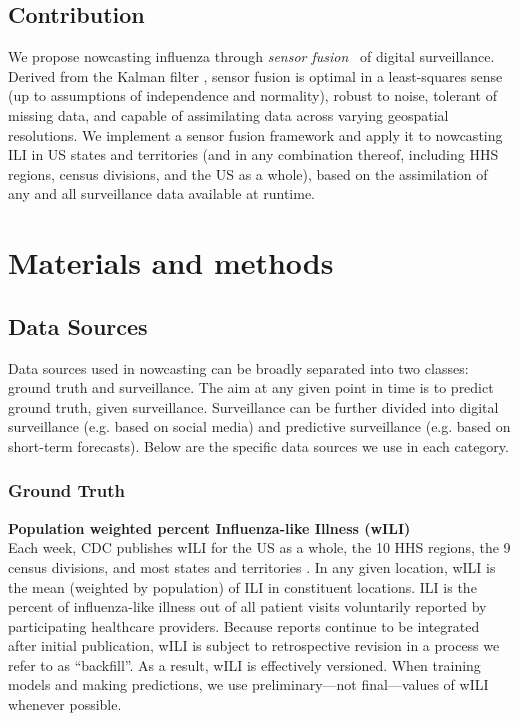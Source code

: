 \documentclass[10pt,letterpaper]{article}
\begin{document}
\subsection*{Contribution}

We propose nowcasting influenza through \emph{sensor
fusion}~\cite{farrow2016modeling} of digital surveillance. Derived from the
Kalman filter \cite{kalman1960new}, sensor fusion is optimal in a least-squares
sense (up to assumptions of independence and normality), robust to noise,
tolerant of missing data, and capable of assimilating data across varying
geospatial resolutions. We implement a sensor fusion framework and apply it to
nowcasting ILI in US states and territories (and in any combination thereof,
including HHS regions, census divisions, and the US as a whole), based on the
assimilation of any and all surveillance data available at runtime.

\section*{Materials and methods}

\subsection*{Data Sources}

Data sources used in nowcasting can be broadly separated into two classes:
ground truth and surveillance. The aim at any given point in time is to predict
ground truth, given surveillance. Surveillance can be further divided into
digital surveillance (e.g. based on social media) and predictive surveillance
(e.g. based on short-term forecasts). Below are the specific data sources we
use in each category.

\subsubsection*{Ground Truth}

\begin{description}
  \item{\textbf{Population weighted percent Influenza-like Illness (wILI)}} \\
    Each week, CDC publishes wILI for the US as a whole, the 10 HHS regions,
    the 9 census divisions, and most states and territories \cite{wilisrc}. In
    any given location, wILI is the mean (weighted by population) of ILI in
    constituent locations. ILI is the percent of influenza-like illness out of
    all patient visits voluntarily reported by participating healthcare
    providers. Because reports continue to be integrated after initial
    publication, wILI is subject to retrospective revision in a process we
    refer to as ``backfill''. As a result, wILI is effectively versioned. When
    training models and making predictions, we use preliminary---not
    final---values of wILI whenever possible.
\end{description}
\end{document}
